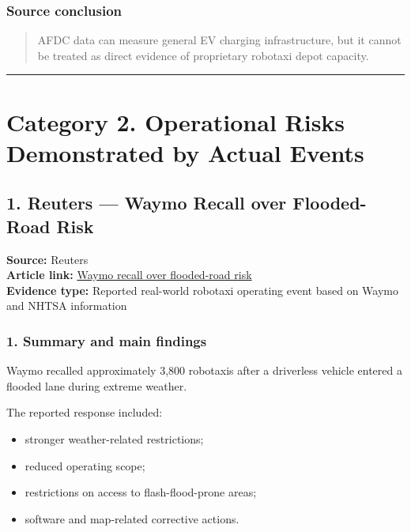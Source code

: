 \documentclass[10pt,a4paper]{article}
\providecommand{\tightlist}{\setlength{\itemsep}{0pt}\setlength{\parskip}{0pt}}
\begin{document}
\hypertarget{source-conclusion-3}{%
\subsubsection{Source conclusion}\label{source-conclusion-3}}

\begin{quote}
AFDC data can measure general EV charging infrastructure, but it cannot be treated as direct evidence of proprietary robotaxi depot capacity.
\end{quote}

\begin{center}\rule{0.5\linewidth}{0.5pt}\end{center}

\hypertarget{category-2.-operational-risks-demonstrated-by-actual-events}{%
\section{Category 2. Operational Risks Demonstrated by Actual Events}\label{category-2.-operational-risks-demonstrated-by-actual-events}}

\hypertarget{reuters-waymo-recall-over-flooded-road-risk}{%
\subsection{1. Reuters --- Waymo Recall over Flooded-Road Risk}\label{reuters-waymo-recall-over-flooded-road-risk}}

\textbf{Source:} Reuters\\
\textbf{Article link:} \href{https://www.reuters.com/legal/litigation/waymo-recall-nearly-3800-robotaxis-over-self-driving-software-issue-2026-05-12/}{Waymo recall over flooded-road risk}\\
\textbf{Evidence type:} Reported real-world robotaxi operating event based on Waymo and NHTSA information

\hypertarget{summary-and-main-findings-4}{%
\subsubsection{1. Summary and main findings}\label{summary-and-main-findings-4}}

Waymo recalled approximately 3,800 robotaxis after a driverless vehicle entered a flooded lane during extreme weather.

The reported response included:

\begin{itemize}
\tightlist
\item
  stronger weather-related restrictions;
\item
  reduced operating scope;
\item
  restrictions on access to flash-flood-prone areas;
\item
  software and map-related corrective actions.
\end{itemize}
\end{document}
